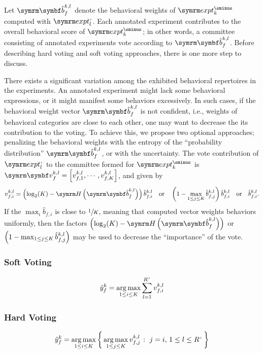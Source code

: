 Let $\V{\hat{b}}_f^{k,l}$ denote the behavioral weights of $\exptUnann_k$ computed with $\exptAnn_l$. Each annotated experiment contributes to the overall behavioral score of $\exptUnann_k$; in other words, a committee consisting of annotated experiments vote according to $\V{\hat{b}}_f^{k,l}$. Before describing hard voting and soft voting approaches, there is one more step to discuss.

There exists a significant variation among the exhibited behavioral repertoires in the experiments.
An annotated experiment might lack some behavioral expressions, or it might manifest some behaviors excessively.
In such cases, if the behavioral weight vector $\V{\hat{b}}_f^{k,l}$ is not confident, i.e., weights of behavioral categories are close to each other, one may want to decrease the its contribution to the voting.
To achieve this, we propose two optional approaches; penalizing the behavioral weights with the entropy of the ``probability distribution'' $\V{\hat{b}}_f^{k,l}$, or with the uncertainty.
The vote contribution of $\exptAnn_l$ to the committee formed for $\exptUnann_k$ is $\V{v}_f^{k,l} = \qmatrix{v_{f,1}^{k,l}, \cdots, v_{f,K}^{k,l}}$, and given by
\begin{equation}
	v_{f,i}^{k,l} = \rbr{\log_2(K) - \entropy{\V{\hat{b}}_f^{k,l}}} \hat{b}_{f,i}^{k,l} \qbor \rbr{ 1 - \max_{1 \leq j \leq K} \hat{b}_{f,j}^{k,l}} \hat{b}_{f,i}^{k,l} \qbor \hat{b}_{f,i}^{k,l}.
\end{equation}
If the $\max_i \hat{b}_{f,i}$ is close to $\sfrac{1}{K}$, meaning that computed vector weights behaviors uniformly, then the factors $\rbr{\log_2(K) - \entropy{\V{\hat{b}}_f^{k,l}}}$ or $\left( 1 - \max_{1 \leq j \leq K} \hat{b}_{f,j}^{k,l}\right)$ may be used to decrease the ``importance'' of the vote.

\subsubsection{Soft Voting}
\begin{equation}
	\hat{y}^k_f = \argmax_{1 \leq i \leq K} \sum_{l=1}^{\Ann{R}} v_{f,i}^{k,l}
\end{equation}

\subsubsection{Hard Voting}
\begin{equation}
	\hat{y}^k_f = \argmax_{1 \leq i \leq K} \Set{\argmax_{1 \leq j \leq K} v_{f,j}^{k,l}}{j=i, \, 1 \leq l \leq \Ann{R}}
\end{equation}
